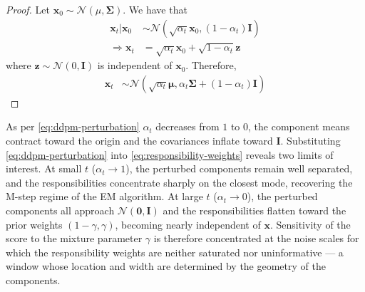 \documentclass[11pt]{article}
\newcommand{\fitparenth}[1]{\left(#1\right)}
\newcommand{\vect}[1]{\mathbf{#1}}
\theoremstyle{plain}
\newcommand{\1}{\mathbbm{1}}
\newcommand{\vx}{\vect{x}}
\begin{document}
\begin{appendices}
\begin{proof}
    Let $\vx_0\sim \mathcal{N}(\mu,\vect \Sigma)$. We have that 
    \begin{align*}
        \vx_t | \vx_0 &\sim \mathcal{N}(\sqrt{\alpha_t} \vx_0, (1-\alpha_t) \vect I)
        \\
        \Longrightarrow \vx_t &= \sqrt{\alpha_t}\vx_0 + \sqrt{1-\alpha_t} \vect z
    \end{align*}
    where $\vect z\sim \mathcal{N}(0,\vect I)$ is independent of $\vx_0$. Therefore,
    \begin{align*}
        \vx_t &\sim \mathcal{N}\fitparenth{\sqrt{\alpha_t} \vect \mu, \alpha_t \vect \Sigma +(1-\alpha_t)\vect I}
    \end{align*}
\end{proof}



As per \eqref{eq:ddpm-perturbation} $\alpha_t$ decreases from $1$ to $0$, the component means contract toward the origin and the covariances inflate toward $\mathbf{I}$. Substituting \eqref{eq:ddpm-perturbation} into \eqref{eq:responsibility-weights} reveals two limits of interest. At small $t$ ($\alpha_t \to 1$), the perturbed components remain well separated, and the responsibilities concentrate sharply on the closest mode, recovering the M-step regime of the EM algorithm. At large $t$ ($\alpha_t \to 0$), the perturbed components all approach $\mathcal{N}(\mathbf{0}, \mathbf{I})$ and the responsibilities flatten toward the prior weights $(1-\gamma, \gamma)$, becoming nearly independent of ${\vx}$. Sensitivity of the score to the mixture parameter $\gamma$ is therefore concentrated at the noise scales for which the responsibility weights are neither saturated nor uninformative --- a window whose location and width are determined by the geometry of the components.


\end{appendices}
\end{document}
